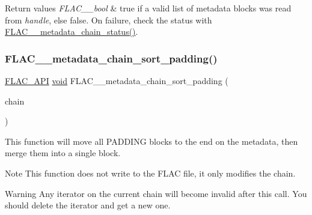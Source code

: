\begin{DoxyRetVals}{Return values}
{\em F\+L\+A\+C\+\_\+\+\_\+bool} & {\ttfamily true} if a valid list of metadata blocks was read from {\itshape handle}, else {\ttfamily false}. On failure, check the status with \hyperlink{group__flac__metadata__level2_ga3d030e216a6517f23372bb76f0639127}{F\+L\+A\+C\+\_\+\+\_\+metadata\+\_\+chain\+\_\+status()}. \\
\hline
\end{DoxyRetVals}
\mbox{\label{group__flac__metadata__level2_gaa14304da1c8e706808cfafa5cbbf575b}} 
\subsubsection{\texorpdfstring{F\+L\+A\+C\+\_\+\+\_\+metadata\+\_\+chain\+\_\+sort\+\_\+padding()}{FLAC\_\_metadata\_chain\_sort\_padding()}}
{\footnotesize\ttfamily \hyperlink{group__flac__export_ga56ca07df8a23310707732b1c0007d6f5}{F\+L\+A\+C\+\_\+\+A\+PI} \hyperlink{png_8h_ac9c84fa68bbad002983e35ce3663c686}{void} F\+L\+A\+C\+\_\+\+\_\+metadata\+\_\+chain\+\_\+sort\+\_\+padding (\begin{DoxyParamCaption}\item[{\hyperlink{group__flac__metadata__level2_gaec6993c60b88f222a52af86f8f47bfdf}{F\+L\+A\+C\+\_\+\+\_\+\+Metadata\+\_\+\+Chain} $\ast$}]{chain }\end{DoxyParamCaption})}

This function will move all P\+A\+D\+D\+I\+NG blocks to the end on the metadata, then merge them into a single block.

\begin{DoxyNote}{Note}
This function does not write to the F\+L\+AC file, it only modifies the chain.
\end{DoxyNote}
\begin{DoxyWarning}{Warning}
Any iterator on the current chain will become invalid after this call. You should delete the iterator and get a new one.
\end{DoxyWarning}

